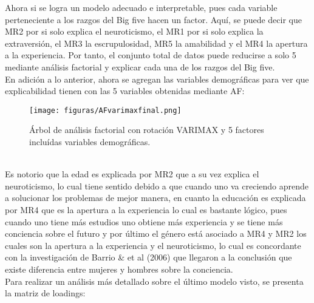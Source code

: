 \documentclass{report}
\begin{document}
Ahora si se logra un modelo adecuado e interpretable, pues cada variable perteneciente a los razgos del Big five hacen un factor. Aquí, se puede decir que MR2 por si solo explica el neuroticismo, el MR1 por si solo explica la extraversión, el MR3 la escrupulosidad, MR5 la amabilidad y el MR4 la apertura a la experiencia. Por tanto, el conjunto total de datos puede reducirse a solo 5 mediante análisis factorial y explicar cada una de los razgos del Big five.\\

En adición a lo anterior, ahora se agregan las variables demográficas para ver que explicabilidad tienen con las 5 variables obtenidas mediante AF:\\
\vspace{5cm}

\begin{figure}[htp]
        \centering
    	\texttt{[image: figuras/AFvarimaxfinal.png]}
    	\caption{Árbol de análisis factorial con rotación VARIMAX y 5 factores incluídas variables demográficas.}
    	\label{fig: Figura1}
\end{figure}\\

Es notorio que la edad es explicada por MR2 que a su vez explica el neuroticismo, lo cual tiene sentido debido a que cuando uno va creciendo aprende a solucionar los problemas de mejor manera, en cuanto la educación es explicada por MR4 que es la apertura a la experiencia lo cual es bastante lógico, pues cuando uno tiene más estudios uno obtiene más experiencia y se tiene más conciencia sobre el futuro y por último el género está asociado a MR4 y MR2 los cuales son la apertura a la experiencia y el neuroticismo, lo cual es concordante con la investigación de Barrio \& et al (2006) que llegaron a la conclusión que existe diferencia entre mujeres y hombres sobre la conciencia.\\

Para realizar un análisis más detallado sobre el último modelo visto, se presenta la matriz de loadings:\\
\vspace{7cm}
\end{document}
